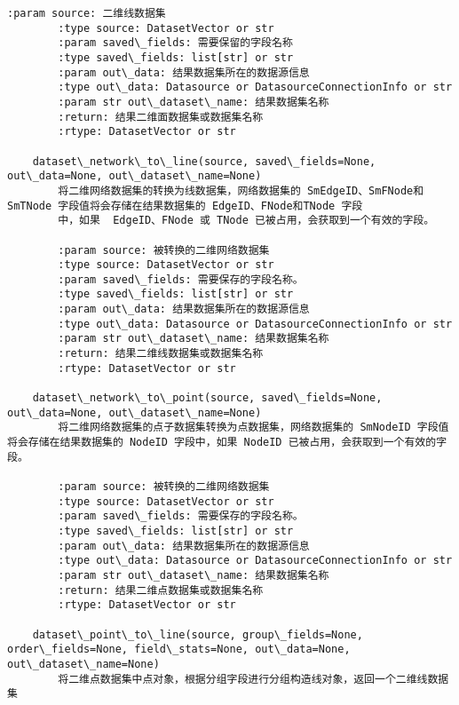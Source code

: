 \documentclass[11pt]{article}
\begin{document}
\begin{Verbatim}[commandchars=\\\{\}]
        :param source: 二维线数据集
        :type source: DatasetVector or str
        :param saved\_fields: 需要保留的字段名称
        :type saved\_fields: list[str] or str
        :param out\_data: 结果数据集所在的数据源信息
        :type out\_data: Datasource or DatasourceConnectionInfo or str
        :param str out\_dataset\_name: 结果数据集名称
        :return: 结果二维面数据集或数据集名称
        :rtype: DatasetVector or str
    
    dataset\_network\_to\_line(source, saved\_fields=None, out\_data=None, out\_dataset\_name=None)
        将二维网络数据集的转换为线数据集，网络数据集的 SmEdgeID、SmFNode和SmTNode 字段值将会存储在结果数据集的 EdgeID、FNode和TNode 字段
        中，如果  EdgeID、FNode 或 TNode 已被占用，会获取到一个有效的字段。
        
        :param source: 被转换的二维网络数据集
        :type source: DatasetVector or str
        :param saved\_fields: 需要保存的字段名称。
        :type saved\_fields: list[str] or str
        :param out\_data: 结果数据集所在的数据源信息
        :type out\_data: Datasource or DatasourceConnectionInfo or str
        :param str out\_dataset\_name: 结果数据集名称
        :return: 结果二维线数据集或数据集名称
        :rtype: DatasetVector or str
    
    dataset\_network\_to\_point(source, saved\_fields=None, out\_data=None, out\_dataset\_name=None)
        将二维网络数据集的点子数据集转换为点数据集，网络数据集的 SmNodeID 字段值将会存储在结果数据集的 NodeID 字段中，如果 NodeID 已被占用，会获取到一个有效的字段。
        
        :param source: 被转换的二维网络数据集
        :type source: DatasetVector or str
        :param saved\_fields: 需要保存的字段名称。
        :type saved\_fields: list[str] or str
        :param out\_data: 结果数据集所在的数据源信息
        :type out\_data: Datasource or DatasourceConnectionInfo or str
        :param str out\_dataset\_name: 结果数据集名称
        :return: 结果二维点数据集或数据集名称
        :rtype: DatasetVector or str
    
    dataset\_point\_to\_line(source, group\_fields=None, order\_fields=None, field\_stats=None, out\_data=None, out\_dataset\_name=None)
        将二维点数据集中点对象，根据分组字段进行分组构造线对象，返回一个二维线数据集
        

\end{Verbatim}
\end{document}
